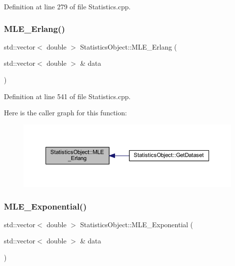 Definition at line 279 of file Statistics.\+cpp.

\mbox{\label{class_statistics_object_af9e2fe4fdb940206e96af126d60a75c1}} 
\subsubsection{\texorpdfstring{M\+L\+E\+\_\+\+Erlang()}{MLE\_Erlang()}}
{\footnotesize\ttfamily std\+::vector$<$ double $>$ Statistics\+Object\+::\+M\+L\+E\+\_\+\+Erlang (\begin{DoxyParamCaption}\item[{std\+::vector$<$ double $>$ \&}]{data }\end{DoxyParamCaption})\hspace{0.3cm}{\ttfamily [protected]}}



Definition at line 541 of file Statistics.\+cpp.

Here is the caller graph for this function\+:
\nopagebreak
\begin{figure}[H]
\begin{center}
\leavevmode
\includegraphics[width=350pt]{class_statistics_object_af9e2fe4fdb940206e96af126d60a75c1_icgraph}
\end{center}
\end{figure}
\mbox{\label{class_statistics_object_a39d960b11bc70f9d402b4f2fb8c31296}} 
\subsubsection{\texorpdfstring{M\+L\+E\+\_\+\+Exponential()}{MLE\_Exponential()}}
{\footnotesize\ttfamily std\+::vector$<$ double $>$ Statistics\+Object\+::\+M\+L\+E\+\_\+\+Exponential (\begin{DoxyParamCaption}\item[{std\+::vector$<$ double $>$ \&}]{data }\end{DoxyParamCaption})\hspace{0.3cm}{\ttfamily [protected]}}



